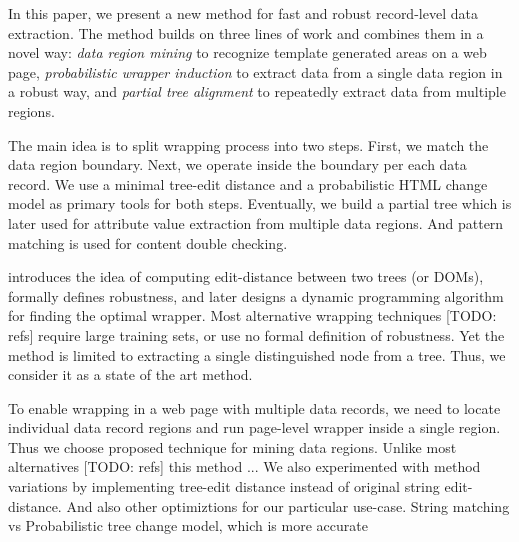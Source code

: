 
In this paper, we present a new method for fast and robust record-level data extraction. The method builds on three lines of work and combines them in a novel way: \emph{data region mining} \cite{liu2009a} to recognize template generated areas on a web page, \emph{probabilistic wrapper induction} \cite{DBLP:journals/pvldb/ParameswaranDGR11} to extract data from a single data region in a robust way, and \emph{partial tree alignment} \cite{zhai2005a} to repeatedly extract data from multiple regions. 

The main idea is to split wrapping process into two steps. First, we match the data region boundary. Next, we operate inside the boundary per each data record. We use a minimal tree-edit distance and a probabilistic HTML change model as primary tools for both steps. Eventually, we build a partial tree which is later used for attribute value extraction from multiple data regions. And pattern matching is used for content double checking.


\cite{DBLP:journals/pvldb/ParameswaranDGR11} introduces the idea of computing edit-distance between two trees (or DOMs), formally defines robustness, and later designs a dynamic programming algorithm for finding the optimal wrapper. Most alternative wrapping techniques [TODO: refs] require large training sets, or use no formal definition of robustness. Yet the method is limited to extracting a single distinguished node from a tree. Thus, we consider it as a state of the art method.

To enable wrapping in a web page with multiple data records, we need to locate individual data record regions and run page-level wrapper inside a single region. Thus we choose \cite{liu2009a} proposed technique for mining data regions. Unlike most alternatives [TODO: refs] this method ... We also experimented with method variations by implementing tree-edit distance instead of original string edit-distance. And also other optimiztions for our particular use-case.
String matching vs Probabilistic tree change model, which is more accurate

